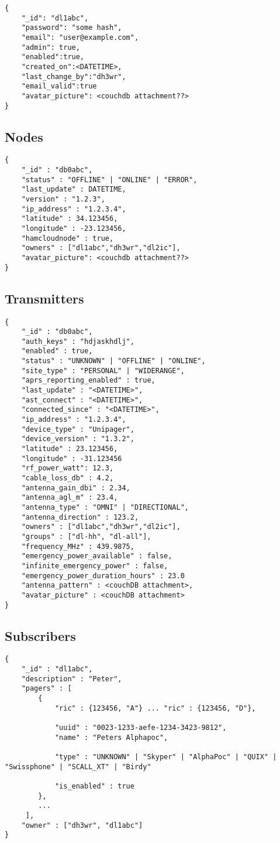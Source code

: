 \documentclass[a4paper]{article}
\begin{document}
\begin{lstlisting}
{
	"_id": "dl1abc",
	"password": "some hash",
    "email": "user@example.com",
    "admin": true,
    "enabled":true,
    "created_on":<DATETIME>,
    "last_change_by":"dh3wr",
    "email_valid":true
    "avatar_picture": <couchdb attachment??>
}
\end{lstlisting}

\subsection{Nodes}
\begin{lstlisting}
{
	"_id" : "db0abc",
	"status" : "OFFLINE" | "ONLINE" | "ERROR",
	"last_update" : DATETIME,
    "version" : "1.2.3",
    "ip_address" : "1.2.3.4",
    "latitude" : 34.123456,
    "longitude" : -23.123456,
    "hamcloudnode" : true,
    "owners" : ["dl1abc","dh3wr","dl2ic"],
    "avatar_picture": <couchdb attachment??>
}
\end{lstlisting}

\subsection{Transmitters}

\begin{lstlisting}
{
	"_id" : "db0abc",
    "auth_keys" : "hdjaskhdlj",
    "enabled" : true,
	"status" : "UNKNOWN" | "OFFLINE" | "ONLINE",
	"site_type" : "PERSONAL" | "WIDERANGE",
	"aprs_reporting_enabled" : true,
    "last_update" : "<DATETIME>",
	"ast_connect" : "<DATETIME>",
	"connected_since" : "<DATETIME>",
    "ip_address" : "1.2.3.4",
    "device_type" : "Unipager",
    "device_version" : "1.3.2",
    "latitude" : 23.123456,
    "longitude" : -31.123456
    "rf_power_watt": 12.3,
    "cable_loss_db" : 4.2,
    "antenna_gain_dbi" : 2.34,
	"antenna_agl_m" : 23.4,
	"antenna_type" : "OMNI" | "DIRECTIONAL",
	"antenna_direction" : 123.2,
    "owners" : ["dl1abc","dh3wr","dl2ic"],
    "groups" : ["dl-hh", "dl-all"],
    "frequency_MHz" : 439.9875,
    "emergency_power_available" : false,
    "infinite_emergency_power" : false,
	"emergency_power_duration_hours" : 23.0        
    "antenna_pattern" : <couchDB attachment>,
    "avatar_picture" : <couchDB attachment>
}
\end{lstlisting}

 
\subsection{Subscribers}
\begin{lstlisting}
{
	"_id" : "dl1abc",
	"description" : "Peter",
	"pagers" : [
		{
    		"ric" : {123456, "A"} ... "ric" : {123456, "D"},

			"uuid" : "0023-1233-aefe-1234-3423-9812",
    		"name" : "Peters Alphapoc",

			"type" : "UNKNOWN" | "Skyper" | "AlphaPoc" | "QUIX" | "Swissphone" | "SCALL_XT" | "Birdy"

			"is_enabled" : true
     	},
     	...
     ],
    "owner" : ["dh3wr", "dl1abc"]
}
\end{lstlisting}
\end{document}
